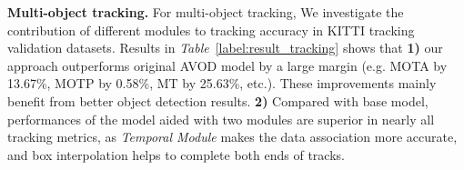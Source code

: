 \documentclass[letterpaper, 10pt, conference]{ieeeconf}  %
\def\tablename{\emph{Table}}
\begin{document}
\begin{table}
	\vspace{-0.3cm}
	\caption{Comparison of publicly available methods of 3D multi-object tracking in the KITTI Tracking Benchmark. The time for object detection is not included in the specified runtime.}
	\label{label:result_kitti}
\end{table}

\textbf{Multi-object tracking.} For multi-object tracking, We investigate the contribution of different modules to tracking accuracy in KITTI tracking validation datasets. Results in \tablename \, \ref{label:result_tracking} shows that \textbf{1)} our approach outperforms original AVOD model by a large margin (e.g. MOTA by 13.67\%, MOTP by 0.58\%, MT by 25.63\%, etc.). These improvements mainly benefit from better object detection results. \textbf{2)} Compared with base model, performances of the model aided with two modules are superior in nearly all tracking metrics, as \textit{Temporal Module} makes the data association more accurate, and box interpolation helps to complete both ends of tracks. 
\end{document}
